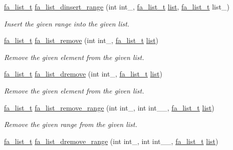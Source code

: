 \begin{DoxyCompactItemize}
\hyperlink{group___fa_list_ga35ecb12ab934ded0cce0bcf28e3bc5d2}{fa\-\_\-list\-\_\-t} \hyperlink{group___fa_list_ga67e7e8d689f484ded07883d135e29fae}{fa\-\_\-list\-\_\-dinsert\-\_\-range} (int int\-\_\-, \hyperlink{group___fa_list_ga35ecb12ab934ded0cce0bcf28e3bc5d2}{fa\-\_\-list\-\_\-t} \hyperlink{literals_8h_a4ddd63dfcfec2b4d5741a56aa6003c76}{list}, \hyperlink{group___fa_list_ga35ecb12ab934ded0cce0bcf28e3bc5d2}{fa\-\_\-list\-\_\-t} list\-\_\-)
\begin{DoxyCompactList}\small\item\em Insert the given range into the given list. \end{DoxyCompactList}\item 
\hyperlink{group___fa_list_ga35ecb12ab934ded0cce0bcf28e3bc5d2}{fa\-\_\-list\-\_\-t} \hyperlink{group___fa_list_ga772f3587a85d9a88fca19947e15defe1}{fa\-\_\-list\-\_\-remove} (int int\-\_\-, \hyperlink{group___fa_list_ga35ecb12ab934ded0cce0bcf28e3bc5d2}{fa\-\_\-list\-\_\-t} \hyperlink{literals_8h_a4ddd63dfcfec2b4d5741a56aa6003c76}{list})
\begin{DoxyCompactList}\small\item\em Remove the given element from the given list. \end{DoxyCompactList}\item 
\hyperlink{group___fa_list_ga35ecb12ab934ded0cce0bcf28e3bc5d2}{fa\-\_\-list\-\_\-t} \hyperlink{group___fa_list_ga042a5ea58a8b932fa106422c672fcee2}{fa\-\_\-list\-\_\-dremove} (int int\-\_\-, \hyperlink{group___fa_list_ga35ecb12ab934ded0cce0bcf28e3bc5d2}{fa\-\_\-list\-\_\-t} \hyperlink{literals_8h_a4ddd63dfcfec2b4d5741a56aa6003c76}{list})
\begin{DoxyCompactList}\small\item\em Remove the given element from the given list. \end{DoxyCompactList}\item 
\hyperlink{group___fa_list_ga35ecb12ab934ded0cce0bcf28e3bc5d2}{fa\-\_\-list\-\_\-t} \hyperlink{group___fa_list_gab4296c34597889e6867d62f7ff0735d6}{fa\-\_\-list\-\_\-remove\-\_\-range} (int int\-\_\-, int int\-\_\-\-\_\-, \hyperlink{group___fa_list_ga35ecb12ab934ded0cce0bcf28e3bc5d2}{fa\-\_\-list\-\_\-t} \hyperlink{literals_8h_a4ddd63dfcfec2b4d5741a56aa6003c76}{list})
\begin{DoxyCompactList}\small\item\em Remove the given range from the given list. \end{DoxyCompactList}\item 
\hyperlink{group___fa_list_ga35ecb12ab934ded0cce0bcf28e3bc5d2}{fa\-\_\-list\-\_\-t} \hyperlink{group___fa_list_ga2a75ab270642d7023d831b7910f5d99a}{fa\-\_\-list\-\_\-dremove\-\_\-range} (int int\-\_\-, int int\-\_\-\-\_\-, \hyperlink{group___fa_list_ga35ecb12ab934ded0cce0bcf28e3bc5d2}{fa\-\_\-list\-\_\-t} \hyperlink{literals_8h_a4ddd63dfcfec2b4d5741a56aa6003c76}{list})

\end{DoxyCompactItemize}
